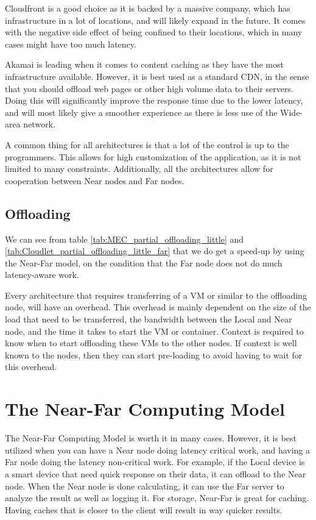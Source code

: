 Cloudfront is a good choice as it is backed by a massive company, which has infrastructure in a lot of locations, and will likely expand in the future. It comes with the negative side effect of being confined to their locations, which in many cases might have too much latency.

Akamai is leading when it comes to content caching as they have the most infrastructure available. However, it is best used as a standard CDN, in the sense that you should offload web pages or other high volume data to their servers. Doing this will significantly improve the response time due to the lower latency, and will most likely give a smoother experience as there is less use of the Wide-area network.

A common thing for all architectures is that a lot of the control is up to the programmers. This allows for high customization of the application, as it is not limited to many constraints. Additionally, all the architectures allow for cooperation between Near nodes and Far nodes. 


\subsection{Offloading}
We can see from table \ref{tab:MEC_partial_offloading_little} and \ref{tab:Cloudlet_partial_offloading_little_far} that we do get a speed-up by using the Near-Far model, on the condition that the Far node does not do much latency-aware work. 

Every architecture that requires transferring of a VM or similar to the offloading node, will have an overhead. This overhead is mainly dependent on the size of the load that need to be transferred, the bandwidth between the Local and Near node, and the time it takes to start the VM or container. Context is required to know when to start offloading these VMs to the other nodes. If context is well known to the nodes, then they can start pre-loading to avoid having to wait for this overhead.







\section{The Near-Far Computing Model}
The Near-Far Computing Model is worth it in many cases. However, it is best utilized when you can have a Near node doing latency critical work, and having a Far node doing the latency non-critical work. For example, if the Local device is a smart device that need quick response on their data, it can offload to the Near node. When the Near node is done calculating, it can use the Far server to analyze the result as well as logging it. For storage, Near-Far is great for caching. Having caches that is closer to the client will result in way quicker results.

